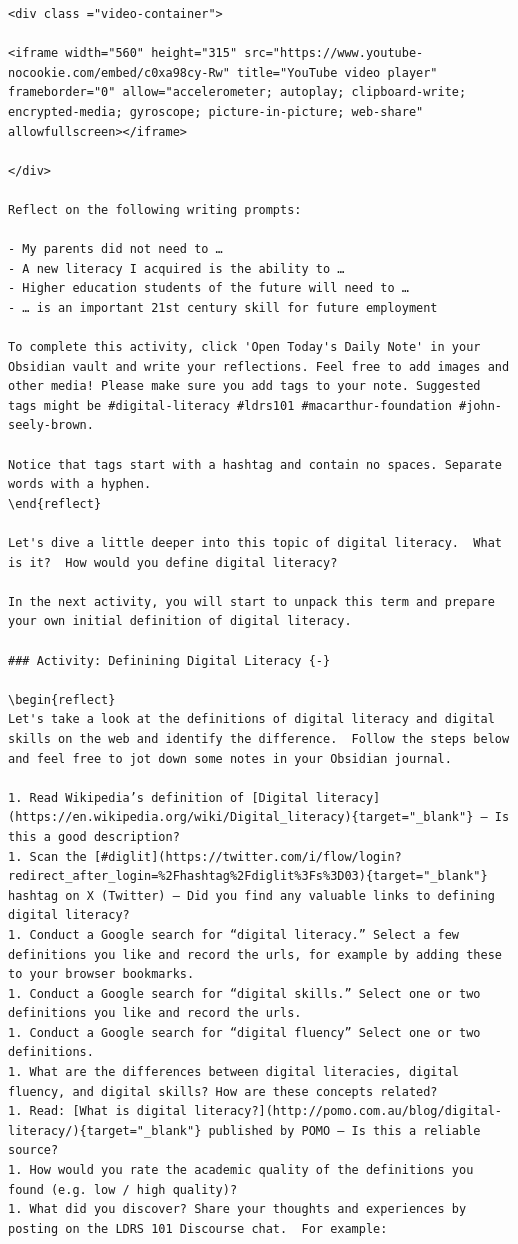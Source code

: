 \documentclass[
]{book}
\theoremstyle{definition}
\theoremstyle{definition}
\theoremstyle{definition}
\theoremstyle{definition}
\theoremstyle{remark}
\begin{document}
\begin{verbatim}
<div class ="video-container">

<iframe width="560" height="315" src="https://www.youtube-nocookie.com/embed/c0xa98cy-Rw" title="YouTube video player" frameborder="0" allow="accelerometer; autoplay; clipboard-write; encrypted-media; gyroscope; picture-in-picture; web-share" allowfullscreen></iframe> 

</div>

Reflect on the following writing prompts:

- My parents did not need to …  
- A new literacy I acquired is the ability to …  
- Higher education students of the future will need to …  
- … is an important 21st century skill for future employment  

To complete this activity, click 'Open Today's Daily Note' in your Obsidian vault and write your reflections. Feel free to add images and other media! Please make sure you add tags to your note. Suggested tags might be #digital-literacy #ldrs101 #macarthur-foundation #john-seely-brown.

Notice that tags start with a hashtag and contain no spaces. Separate words with a hyphen.
\end{reflect}

Let's dive a little deeper into this topic of digital literacy.  What is it?  How would you define digital literacy?

In the next activity, you will start to unpack this term and prepare your own initial definition of digital literacy.

### Activity: Definining Digital Literacy {-}

\begin{reflect}
Let's take a look at the definitions of digital literacy and digital skills on the web and identify the difference.  Follow the steps below and feel free to jot down some notes in your Obsidian journal.

1. Read Wikipedia’s definition of [Digital literacy](https://en.wikipedia.org/wiki/Digital_literacy){target="_blank"} – Is this a good description?
1. Scan the [#diglit](https://twitter.com/i/flow/login?redirect_after_login=%2Fhashtag%2Fdiglit%3Fs%3D03){target="_blank"} hashtag on X (Twitter) – Did you find any valuable links to defining digital literacy?
1. Conduct a Google search for “digital literacy.” Select a few definitions you like and record the urls, for example by adding these to your browser bookmarks.
1. Conduct a Google search for “digital skills.” Select one or two definitions you like and record the urls.
1. Conduct a Google search for “digital fluency” Select one or two definitions.
1. What are the differences between digital literacies, digital fluency, and digital skills? How are these concepts related?
1. Read: [What is digital literacy?](http://pomo.com.au/blog/digital-literacy/){target="_blank"} published by POMO – Is this a reliable source?
1. How would you rate the academic quality of the definitions you found (e.g. low / high quality)?
1. What did you discover? Share your thoughts and experiences by posting on the LDRS 101 Discourse chat.  For example:


\end{verbatim}
\end{document}
